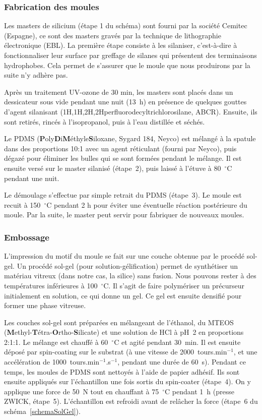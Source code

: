 		\subsubsection{Fabrication des moules}
Les masters de silicium (étape 1 du schéma) sont fourni par la société Cemitec (Espagne), ce sont des masters gravés par la technique de lithographie électronique (EBL). La première étape consiste à les silaniser, c'est-à-dire à fonctionnaliser leur surface par greffage de silanes qui présentent des terminaisons hydrophobes. Cela permet de s'assurer que le moule que nous produirons par la suite n'y adhère pas.\par 
Après un traitement UV-ozone de 30 min, les masters sont placés dans un dessicateur sous vide pendant une nuit (13~h) en présence de quelques gouttes d'agent silanisant (1H,1H,2H,2Hperfluorodecyltrichlorosilane, ABCR). Ensuite, ils sont retirés, rincés à l'isopropanol, puis à l'eau distillée et séchés.\par 
Le PDMS (\textbf{P}oly\textbf{D}i\textbf{M}éthyle\textbf{S}iloxane, Sygard 184, Neyco) est mélangé à la spatule dans des proportions 10:1 avec un agent réticulant (fourni par Neyco), puis dégazé pour éliminer les bulles qui se sont formées pendant le mélange. Il est ensuite versé sur le master silanisé (étape~2), puis laissé à l'étuve à 80~$^\circ$C pendant une nuit.\par 
Le démoulage s'effectue par simple retrait du PDMS (étape~3). Le moule est recuit à 150~$^\circ$C pendant 2 h pour éviter une éventuelle réaction postérieure du moule. Par la suite, le master peut servir pour fabriquer de nouveaux moules.\par 

		\subsubsection{Embossage}
L'impression du motif du moule se fait sur une couche obtenue par le procédé sol-gel. Un procédé sol-gel (pour solution-gélification) permet de synthétiser un matériau vitreux (dans notre cas, la silice) sans fusion. Nous pouvons rester à des températures inférieures à 100~$^\circ$C. Il s'agit de faire polymériser un précurseur initialement en solution, ce qui donne un gel. Ce gel est ensuite densifié pour former une phase vitreuse.\par 
Les couches sol-gel sont préparées en mélangeant de l'éthanol, du MTEOS (\textbf{M}ethyl{-}\textbf{T}étra{-}\textbf{O}rtho{-}\textbf{S}ilicate) et une solution de HCl à pH~2 en proportions 2:1:1. Le mélange est chauffé à 60~$^\circ$C et agité pendant 30~min. Il est ensuite déposé par spin-coating sur le substrat (à une vitesse de 2000~tours.min$^{-1}$, et une accélération de 1000~tours.min$^{-1}$.s$^{-1}$, pendant une durée de 60~s). Pendant ce temps, les moules de PDMS sont nettoyés à l'aide de papier adhésif. Ils sont ensuite appliqués sur l'échantillon une fois sortis du spin-coater (étape~4). On y applique une force de 50~N tout en chauffant à 75~$^\circ$C pendant 1~h (presse ZWICK, étape~5). L'échantillon est refroidi avant de relâcher la force (étape~6 du schéma~\ref{schemaSolGel}).\par 

